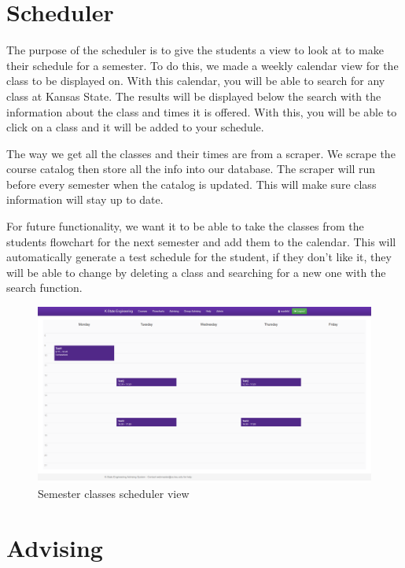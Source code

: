 \documentclass[12pt]{article}
\begin{document}
\section{Scheduler}

The purpose of the scheduler is to give the students a view to look at to make their schedule for a semester. To do this, we made a weekly calendar view for the class to be displayed on. With this calendar, you will be able to search for any class at Kansas State. The results will be displayed below the search with the information about the class and times it is offered. With this, you will be able to click on a class and it will be added to your schedule.

The way we get all the classes and their times are from a scraper. We scrape the course catalog then store all the info into our database. The scraper will run before every semester when the catalog is updated. This will make sure class information will stay up to date.

For future functionality, we want it to be able to take the classes from the students flowchart for the next semester and add them to the calendar. This will automatically generate a test schedule for the student, if they don’t like it, they will be able to change by deleting a class and searching for a new one with the search function.

\begin{figure}
    \centering
    \includegraphics[width=\textwidth]{semester.png}
    \caption{Semester classes scheduler view}
    \label{fig:semester}
\end{figure}

\section{Advising}
\end{document}
